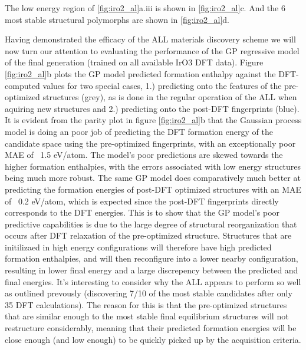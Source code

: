 %
The low energy region of \ref{fig:iro2_al}a.iii is shown in \ref{fig:iro2_al}c.
%
And the 6 most stable structural polymorphs are shown in \ref{fig:iro2_al}d.


Having demonstrated the efficacy of the ALL materials discovery scheme we will now turn our attention to evaluating the performance of the GP regressive model of the final generation (trained on all available IrO3 DFT data).
%
Figure \ref{fig:iro2_al}b plots the GP model predicted formation enthalpy against the DFT-computed values for two special cases,
1.) predicting onto the features of the pre-optimized structures (grey), as is done in the regular operation of the ALL when aquiring new structures and
2.) predicting onto the post-DFT fingerprints (blue).
%
It is evident from the parity plot in figure \ref{fig:iro2_al}b that the Gaussian process model is doing an poor job of predicting the DFT formation energy of the candidate space using the pre-optimized fingerprints,
with an exceptionally poor MAE of ~1.5 eV/atom.
%
The model's poor predictions are skewed towards the higher formation enthalpies, with the errors associated with low energy structures being much more robust.
%
The same GP model does comparatively much better at predicting the formation energies of post-DFT optimized structures with an MAE of ~0.2 eV/atom,
which is expected since the post-DFT fingerprints directly corresponds to the DFT energies.
%
This is to show that the GP model's poor predictive capabilities is due to the large degree of structural reorganization that occurs after DFT relaxation of the pre-optimized structure.
%
Structures that are initilizaed in high energy configurations will therefore have high predicted formation enthalpies, and will then reconfigure into a lower nearby configuration, resulting in lower final energy and a large discrepency between the predicted and final energies.
%
It's interesting to consider why the ALL appears to perform so well as outlined prevously (discovering 7/10 of the most stable candidates after only 35 DFT calculations).
%
The reason for this is that the pre-optimized structures that are similar enough to the most stable final equilibrium structures will not restructure considerably, meaning that their predicted formation energies will be close enough (and low enough) to be quickly picked up by the acquisition criteria.
%



